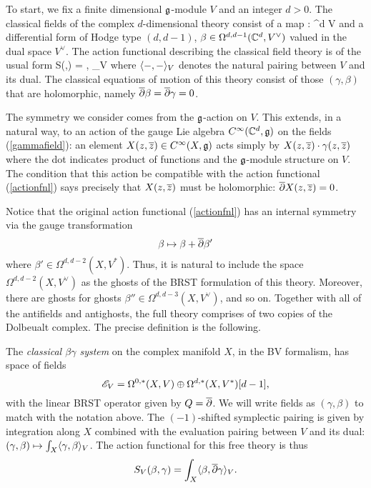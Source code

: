 To start, we fix a finite dimensional $\mathfrak g$-module $V$ and an integer $d > 0$.
The classical fields of the complex $d$-dimensional theory consist of a map
\beqn\label{gammafield}
\gamma : \CC^d \to V
\eeqn
and a differential form of Hodge type $(d,d-1)$, $\beta \in \Omega^{d,d-1}(\mathbb C^d, V^\vee)$ valued in the dual space $V^\vee$. 
The action functional describing the classical field theory is of the usual form
\beqn\label{actionfnl}
S(\gamma,\beta) = \int \<\beta, \dbar\gamma\>_V
\eeqn
where $\langle-,-\rangle_V$ denotes the natural pairing between $V$ and its dual. 
The classical equations of motion of this theory consist of those $(\gamma,\beta)$ that are holomorphic, namely $\overline{\partial} \beta = \overline{\partial} \gamma = 0$. 

The symmetry we consider comes from the $\mathfrak g$-action on $V$. 
This extends, in a natural way, to an action of the gauge Lie algebra $C^\infty(\mathbb C^d, \mathfrak g)$ on the fields (\ref{gammafield}): an element $X(z,\overline{z}) \in C^\infty(X,\mathfrak g)$ acts simply by $X(z,\overline{z}) \cdot \gamma(z,\overline{z})$ where the dot indicates product of functions and the $\mathfrak g$-module structure on $V$. 
The condition that this action be compatible with the action functional (\ref{actionfnl}) says precisely that $X(z,\overline{z})$ must be holomorphic: $\overline{\partial} X(z,\overline{z}) = 0$. 

Notice that the original action functional (\ref{actionfnl}) has an internal symmetry via the gauge transformation
\[
\beta \mapsto \beta + \overline{\partial} \beta' 
\]
where $\beta' \in \Omega^{d,d-2} (X, V^*)$. 
Thus, it is natural to include the space $\Omega^{d,d-2} (X, V^\vee)$ as the ghosts of the BRST formulation of this theory. 
Moreover, there are ghosts for ghosts $\beta'' \in \Omega^{d,d-3}(X , V^\vee)$, and so on.
Together with all of the antifields and antighosts, the full theory comprises of two copies of the Dolbeualt complex.
The precise definition is the following.

\begin{dfn}
The {\em classical $\beta\gamma$ system} on the complex manifold $X$, in the BV formalism, has space of fields
\[
\mathscr E_V = \Omega^{0,*}(X , V) \oplus \Omega^{d,*}(X , V^*)[d-1],
\]
with the linear BRST operator given by $Q = \overline{\partial}$.
We will write fields as $(\gamma,\beta)$ to match with the notation above.
The $(-1)$-shifted symplectic pairing is given by integration along $X$ combined with the evaluation pairing between $V$ and its dual: $(\gamma, \beta) \mapsto \int_X \langle\gamma, \beta\rangle_V$. 
The action functional for this free theory is thus
\[
S_V (\beta,\gamma) = \int_X \langle\beta, \overline{\partial} \gamma\rangle_{V} .
\]
\end{dfn}

